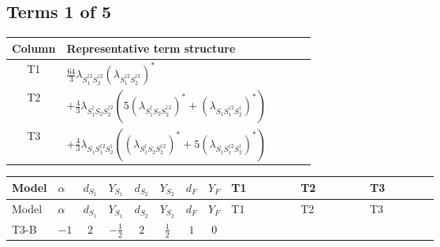 \documentclass[8pt]{article}
\begin{document}
\begin{landscape}
\subsection*{Terms 1 of 5}
\begin{center}
\begin{tabular}{@{}c >{\raggedright\arraybackslash}p{0.82\linewidth}@{}}
\toprule
Column & Representative term structure \\
\midrule
T1 & \(\displaystyle \frac{64}{3} {\lambda_{S_1^{\dagger 2}S_2^{\dagger 2}}} \left({\lambda_{S_1^{\dagger 2}S_2^{\dagger 2}}}\right)^{*}\) \\
\midrule
T2 & \(\displaystyle +\frac{4}{3} {\lambda_{S_1^\dagger S_2 S_2^{\dagger 2}}} (5 \left({\lambda_{S_1^\dagger S_2 S_2^{\dagger 2}}}\right)^{*}+\left({\lambda_{S_1 S_1^{\dagger 2}S_2^\dagger}}\right)^{*})\) \\
\midrule
T3 & \(\displaystyle +\frac{4}{3} {\lambda_{S_1 S_1^{\dagger 2}S_2^\dagger}} (\left({\lambda_{S_1^\dagger S_2 S_2^{\dagger 2}}}\right)^{*}+5 \left({\lambda_{S_1 S_1^{\dagger 2}S_2^\dagger}}\right)^{*})\) \\
\midrule
\bottomrule
\end{tabular}
\end{center}
\smallskip
\tiny
\begin{longtable}{@{}llcccccc >{\raggedright\arraybackslash}p{0.21\linewidth} >{\raggedright\arraybackslash}p{0.21\linewidth} >{\raggedright\arraybackslash}p{0.21\linewidth}@{}}
\toprule
Model & $\alpha$ & $d_{S_1}$ & $Y_{S_1}$ & $d_{S_2}$ & $Y_{S_2}$ & $d_F$ & $Y_F$ & T1 & T2 & T3 \\
\midrule
\endfirsthead
\toprule
Model & $\alpha$ & $d_{S_1}$ & $Y_{S_1}$ & $d_{S_2}$ & $Y_{S_2}$ & $d_F$ & $Y_F$ & T1 & T2 & T3 \\
\midrule
\endhead
T3-B & $-1$ & $2$ & $-\frac{1}{2}$ & $2$ & $\frac{1}{2}$ & $1$ & $0$ & \scriptsize\adjustbox{max width=\linewidth}{$\begin{gathered} \frac{64}{3} {\lambda_{S_1^{\dagger 2}S_2^{\dagger 2}}} \left({\lambda_{S_1^{\dagger 2}S_2^{\dagger 2}}}\right)^{*}\end{gathered}$} & \scriptsize\adjustbox{max width=\linewidth}{$\begin{gathered} +\frac{4}{3} {\lambda_{S_1^\dagger S_2 S_2^{\dagger 2}}} (5 \left({\lambda_{S_1^\dagger S_2 S_2^{\dagger 2}}}\right)^{*}+\left({\lambda_{S_1 S_1^{\dagger 2}S_2^\dagger}}\right)^{*})\end{gathered}$} & \scriptsize\adjustbox{max width=\linewidth}{$\begin{gathered} +\frac{4}{3} {\lambda_{S_1 S_1^{\dagger 2}S_2^\dagger}} (\left({\lambda_{S_1^\dagger S_2 S_2^{\dagger 2}}}\right)^{*}+5 \left({\lambda_{S_1 S_1^{\dagger 2}S_2^\dagger}}\right)^{*})\end{gathered}$} \\

\end{longtable}
\end{landscape}
\end{document}
